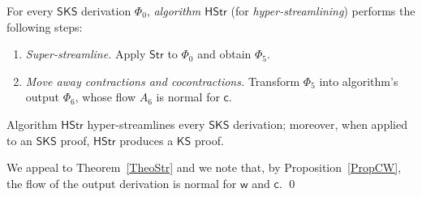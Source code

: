 \documentclass[a4paper]{LMCS}
\begin{document}
\begin{defi}
For every ${\mathsf{SKS}}$ derivation $\Phi_0$, \emph{algorithm\/ ${\mathsf{HStr}}$} (for \emph{hyper-streamlining}) performs the following steps:
\begin{enumerate}
\item\emph{Super-streamline.} Apply ${\mathsf{Str}}$ to $\Phi_0$ and obtain $\Phi_5$.
\item\emph{Move away contractions and cocontractions.} Transform $\Phi_5$ into algorithm's output $\Phi_6$, whose flow $A_6$ is normal for ${{\mathsf c}}$.
\end{enumerate}
\end{defi}

\begin{thm}
Algorithm\/ ${\mathsf{HStr}}$ hyper-streamlines every\/ ${\mathsf{SKS}}$ derivation; moreover, when applied to an\/ ${\mathsf{SKS}}$ proof, ${\mathsf{HStr}}$ produces a\/ ${\mathsf{KS}}$ proof.
\end{thm}

\proof
We appeal to Theorem~\ref{TheoStr} and we note that, by Proposition~\ref{PropCW}, the flow of the output derivation is normal for ${{\mathsf w}}$ and ${{\mathsf c}}$. 
\qed
\end{document}
